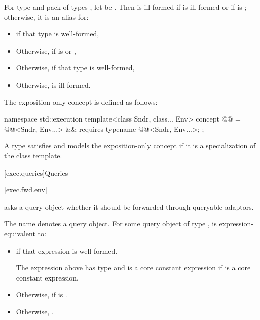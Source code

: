 \pnum
For type  and pack of types ,
let  be .
Then  is ill-formed
if  is ill-formed or
if  is ;
otherwise, it is an alias for:
\begin{itemize}
\item
{}
if that type is well-formed,
\item
Otherwise, 
if  is
 or ,
\item
Otherwise, 
if that\linebreak{} type is well-formed,
\item
Otherwise,  is ill-formed.
\end{itemize}

\pnum
The exposition-only concept  is defined as follows:
\begin{codeblock}
namespace std::execution {
  template<class Sndr, class... Env>
    concept @@ = @@<Sndr, Env...> &&
      requires {
        typename @@<Sndr, Env...>;
      };
}
\end{codeblock}

\pnum
A type satisfies and models the exposition-only concept
 if
it is a specialization of the  class template.

[exec.queries]{Queries}

[exec.fwd.env]{}

\pnum
{} asks a query object
whether it should be forwarded through queryable adaptors.

\pnum
The name  denotes a query object.
For some query object  of type ,
 is expression-equivalent to:
\begin{itemize}
\item
{}
if that expression is well-formed.

\mandates
The expression above has type  and
is a core constant expression if  is a core constant expression.
\item
Otherwise,  if  is .
\item
Otherwise, .
\end{itemize}

